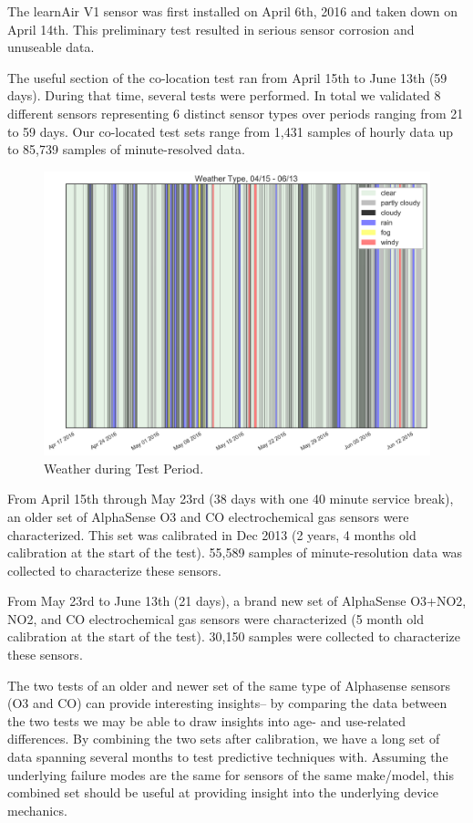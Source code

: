 The learnAir V1 sensor was first installed on April 6th, 2016 and taken down on April 14th.  This preliminary test resulted in serious sensor corrosion and unuseable data.

The useful section of the co-location test ran from April 15th to June 13th (59 days).  During that time, several tests were performed.  In total we validated 8 different sensors representing 6 distinct sensor types over periods ranging from 21 to 59 days.  Our co-located test sets range from 1,431 samples of hourly data up to 85,739 samples of minute-resolved data.  


\begin{figure}[htb]
 	\includegraphics[width=\textwidth-0.5cm]{figs/weather}               
 	 \caption{Weather during Test Period.}
  	\label{fig:weather}
\end{figure}


From April 15th through May 23rd (38 days with one 40 minute service break), an older set of AlphaSense O3 and CO electrochemical gas sensors were characterized.  This set was calibrated in Dec 2013 (2 years, 4 months old calibration at the start of the test).  55,589 samples of minute-resolution data was collected to characterize these sensors.

From May 23rd to June 13th (21 days), a brand new set of AlphaSense O3+NO2, NO2, and CO electrochemical gas sensors were characterized (5 month old calibration at the start of the test).  30,150 samples were collected to characterize these sensors.

The two tests of an older and newer set of the same type of Alphasense sensors (O3 and CO) can provide interesting insights-- by comparing the data between the two tests we may be able to draw insights into age- and use-related differences.  By combining the two sets after calibration, we have a long set of data spanning several months to test predictive techniques with.  Assuming the underlying failure modes are the same for sensors of the same make/model, this combined set should be useful at providing insight into the underlying device mechanics.

